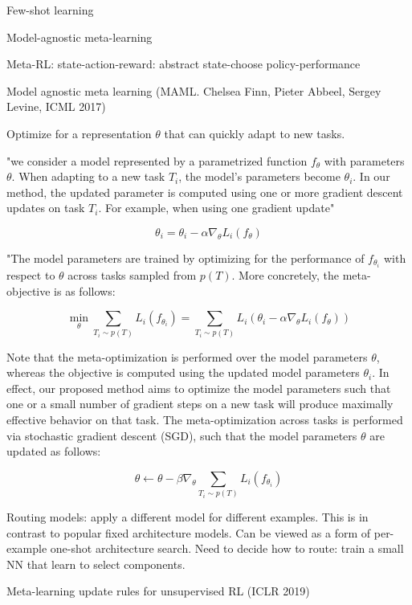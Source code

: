 \documentclass[english]{article}
\begin{document}
Few-shot learning

Model-agnostic meta-learning

Meta-RL: state-action-reward: abstract state-choose policy-performance

\eenum 

\item Model agnostic meta learning (MAML. Chelsea Finn, Pieter Abbeel, Sergey Levine, ICML 2017)

Optimize for a representation $\theta$ that can
quickly adapt to new tasks.

"we consider a model represented by a parametrized function $f_\theta$ with parameters $\theta$. When adapting to a new task $T_i$, the model's parameters become $\theta_i$. In our method, the updated parameter is computed using one or more gradient descent updates on task $T_i$. For
example, when using one gradient update"

$$\theta_i = \theta_i - \alpha \nabla_\theta L_i(f_\theta)$$

"The model parameters are trained by optimizing for the performance of $f_{\theta_i}$  with respect to $\theta$ across tasks sampled from $p(T)$. More concretely, the meta-objective is as follows:

$$\min_\theta 
\sum_{T_i \sim p(T)} L_i(f_{\theta_i}) 
= 
\sum_{T_i \sim p(T)} L_i(\theta_i - \alpha \nabla_\theta L_i(f_\theta)) 
$$


Note that the meta-optimization is performed over the
model parameters $\theta$, whereas the objective is computed using the updated model parameters $\theta_i$. In effect, our proposed method aims to optimize the model parameters such
that one or a small number of gradient steps on a new task
will produce maximally effective behavior on that task.
The meta-optimization across tasks is performed via
stochastic gradient descent (SGD), such that the model parameters $\theta$ are updated as follows:

$$\theta  \gets 
\theta - \beta \nabla_\theta \sum_{T_i \sim p(T)} L_i(f_{\theta_i})
$$

\item Routing models: apply a different model for different examples. This is in contrast to popular fixed architecture models. Can be viewed as a form of per-example one-shot architecture search. Need to decide how to route: train a small NN that learn to select components. 

\item Meta-learning update rules for unsupervised RL (ICLR 2019)
\end{document}
